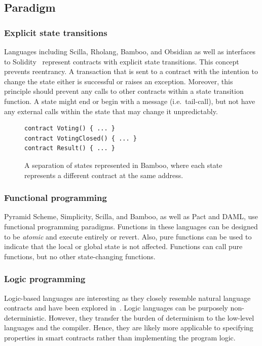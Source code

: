 \subsection{Paradigm}

\subsubsection{Explicit state transitions}
Languages including Scilla, Rholang, Bamboo, and Obsidian as well as interfaces to Solidity~\cite{Mavridou2018} represent contracts with explicit state transitions. 
This concept prevents reentrancy. 
A transaction that is sent to a contract with the intention to change the state either is successful or raises an exception. Moreover, this principle should prevent any calls to other contracts within a state transition function. A state might end or begin with a message (i.e.\ tail-call), but not have any external calls within the state that may change it unpredictably.

\begin{figure}[!h]
\begin{lstlisting}[language=Solidity]
contract Voting() { ... }
contract VotingClosed() { ... }
contract Result() { ... }
\end{lstlisting}
\caption{A separation of states represented in Bamboo, where each state represents a different contract at the same address.}
\label{lst:fsm}
\end{figure}

\subsubsection{Functional programming}
Pyramid Scheme, Simplicity, Scilla, and Bamboo, as well as Pact and DAML, use functional programming paradigms. Functions in these languages can be designed to be \emph{atomic} and execute entirely or revert. Also, pure functions can be used to indicate that the local or global state is not affected. Functions can call pure functions, but no other state-changing functions.

\subsubsection{Logic programming}
Logic-based languages are interesting as they closely resemble natural language contracts and have been explored in~\cite{Idelberger2016}. Logic languages can be purposely non-deterministic. However, they transfer the burden of determinism to the low-level languages and the compiler. Hence, they are likely more applicable to specifying properties in smart contracts rather than implementing the program logic.


